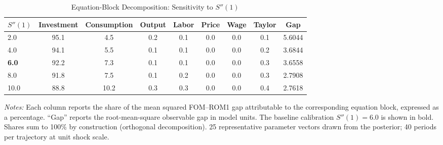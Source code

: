 \begin{table}[htbp]
\centering
\caption{Equation-Block Decomposition: Sensitivity to $S''(1)$}
\label{tab:csadjcost_sensitivity}
\begin{tabular}{lcccccccc}
\toprule
$S''(1)$ & Investment & Consumption & Output & Labor & Price & Wage & Taylor & Gap \\
\midrule
2.0 & 95.1 & 4.5 & 0.2 & 0.1 & 0.0 & 0.0 & 0.1 & 5.6044 \\
4.0 & 94.1 & 5.5 & 0.1 & 0.1 & 0.0 & 0.0 & 0.2 & 3.6844 \\
\textbf{6.0} & 92.2 & 7.3 & 0.1 & 0.1 & 0.0 & 0.0 & 0.3 & 3.6558 \\
8.0 & 91.8 & 7.5 & 0.1 & 0.2 & 0.0 & 0.0 & 0.3 & 2.7908 \\
10.0 & 88.8 & 10.2 & 0.3 & 0.3 & 0.0 & 0.0 & 0.4 & 2.7618 \\
\bottomrule
\end{tabular}
\begin{minipage}{0.92\textwidth}
\footnotesize\textit{Notes:} Each column reports the share of the mean squared FOM--ROM1 gap attributable to the corresponding equation block, expressed as a percentage. ``Gap'' reports the root-mean-square observable gap in model units. The baseline calibration $S''(1) = 6.0$ is shown in bold. Shares sum to 100\% by construction (orthogonal decomposition). 25 representative parameter vectors drawn from the posterior; 40 periods per trajectory at unit shock scale.
\end{minipage}
\end{table}
